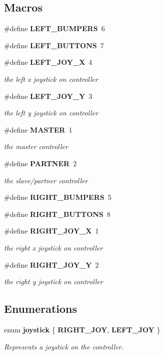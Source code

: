 \subsection*{Macros}
\begin{DoxyCompactItemize}
\item 
\#define \textbf{ L\+E\+F\+T\+\_\+\+B\+U\+M\+P\+E\+RS}~6
\item 
\#define \textbf{ L\+E\+F\+T\+\_\+\+B\+U\+T\+T\+O\+NS}~7
\item 
\#define \textbf{ L\+E\+F\+T\+\_\+\+J\+O\+Y\+\_\+X}~4
\begin{DoxyCompactList}\small\item\em the left x joystick on controller \end{DoxyCompactList}\item 
\#define \textbf{ L\+E\+F\+T\+\_\+\+J\+O\+Y\+\_\+Y}~3
\begin{DoxyCompactList}\small\item\em the left y joystick on controller \end{DoxyCompactList}\item 
\#define \textbf{ M\+A\+S\+T\+ER}~1
\begin{DoxyCompactList}\small\item\em the master controller \end{DoxyCompactList}\item 
\#define \textbf{ P\+A\+R\+T\+N\+ER}~2
\begin{DoxyCompactList}\small\item\em the slave/partner controller \end{DoxyCompactList}\item 
\#define \textbf{ R\+I\+G\+H\+T\+\_\+\+B\+U\+M\+P\+E\+RS}~5
\item 
\#define \textbf{ R\+I\+G\+H\+T\+\_\+\+B\+U\+T\+T\+O\+NS}~8
\item 
\#define \textbf{ R\+I\+G\+H\+T\+\_\+\+J\+O\+Y\+\_\+X}~1
\begin{DoxyCompactList}\small\item\em the right x joystick on controller \end{DoxyCompactList}\item 
\#define \textbf{ R\+I\+G\+H\+T\+\_\+\+J\+O\+Y\+\_\+Y}~2
\begin{DoxyCompactList}\small\item\em the right y joystick on controller \end{DoxyCompactList}\end{DoxyCompactItemize}
\subsection*{Enumerations}
\begin{DoxyCompactItemize}
\item 
enum \textbf{ joystick} \{ \textbf{ R\+I\+G\+H\+T\+\_\+\+J\+OY}, 
\textbf{ L\+E\+F\+T\+\_\+\+J\+OY}
 \}\begin{DoxyCompactList}\small\item\em Represents a joystick on the controller. \end{DoxyCompactList}
\end{DoxyCompactItemize}

